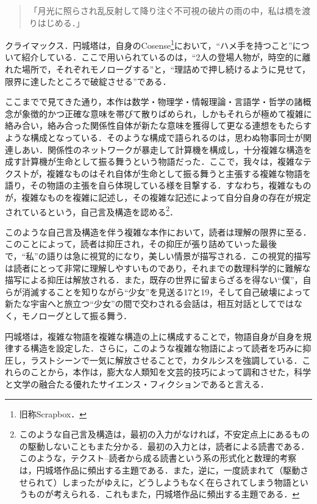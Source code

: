 \documentclass[10pt, a5paper, twoside]{jsarticle}
\theoremstyle{definition}
\begin{document}
			\begin{quote}

				「月光に照らされ乱反射して降り注ぐ不可視の破片の雨の中，私は橋を渡りはじめる．」
				
			\end{quote}

			クライマックス．円城塔は，自身のCosense\footnote{旧称Scrapbox．}\cite{hamete}において，“ハメ手を持つこと”について紹介している．ここで用いられているのは，“2人の登場人物が，時空的に離れた場所で，それぞれモノローグする”と，“理詰めで押し続けるように見せて，限界に達したところで破綻させる”である．

			ここまでで見てきた通り，本作は数学・物理学・情報理論・言語学・哲学の諸概念が象徴的かつ正確な意味を帯びて散りばめられ，しかもそれらが極めて複雑に絡み合い，絡み合った関係性自体が新たな意味を獲得して更なる連想をもたらすような構成となっている．そのような構成で語られるのは，思わぬ物事同士が関連しあい．関係性のネットワークが暴走して計算機を構成し，十分複雑な構造を成す計算機が生命として振る舞うという物語だった．ここで，我々は，複雑なテクストが，複雑なものはそれ自体が生命として振る舞うと主張する複雑な物語を語り，その物語の主張を自ら体現している様を目撃する．すなわち，複雑なものが，複雑なものを複雑に記述し，その複雑な記述によって自分自身の存在が規定されているという，自己言及構造を認める\footnote{このような自己言及構造は，最初の入力がなければ，不安定点上にあるものの駆動しないこともまた分かる．最初の入力とは，読者による読書である．このような，テクスト--読者から成る読書という系の形式化と数理的考察は，円城塔作品に頻出する主題である．また，逆に，一度読まれて（駆動させられて）しまったがゆえに，どうしようもなく在らされてしまう物語というものが考えられる．これもまた，円城塔作品に頻出する主題である．}．

			このような自己言及構造を伴う複雑な本作において，読者は理解の限界に至る．このことによって，読者は抑圧され，その抑圧が張り詰めていった最後で，“私”の語りは急に視覚的になり，美しい情景が描写される．この視覚的描写は読者にとって非常に理解しやすいものであり，それまでの数理科学的に難解な描写による抑圧は解放される．また，既存の世界に留まらざるを得ない“僕”，自らが消滅することを知りながら“少女”を見送る17と19，そして自己破壊によって新たな宇宙へと旅立つ“少女”の間で交わされる会話は，相互対話としてではなく，モノローグとして振る舞う．

			円城塔は，複雑な物語を複雑な構造の上に構成することで，物語自身が自身を規律する構造を設定した．さらに，このような複雑な物語によって読者を巧みに抑圧し，ラストシーンで一気に解放させることで，カタルシスを強調している．これらのことから，本作は，膨大な人類知を文芸的技巧によって調和させた，科学と文学の融合たる優れたサイエンス・フィクションであると言える．
\end{document}
